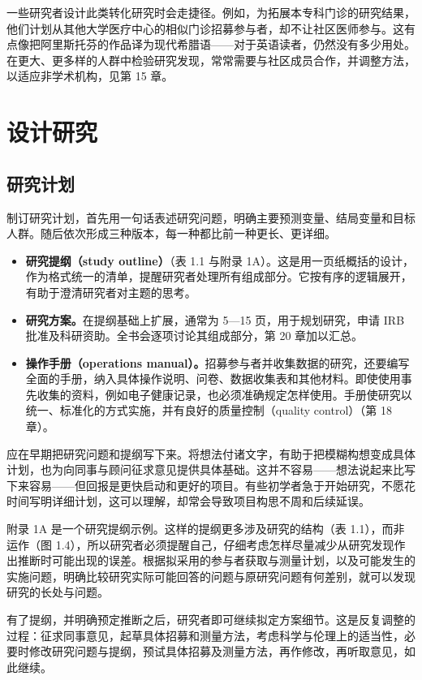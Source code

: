一些研究者设计此类转化研究时会走捷径。例如，为拓展本专科门诊的研究结果，他们计划从其他大学医疗中心的相似门诊招募参与者，却不让社区医师参与。这有点像把阿里斯托芬的作品译为现代希腊语——对于英语读者，仍然没有多少用处。在更大、更多样的人群中检验研究发现，常常需要与社区成员合作，并调整方法，以适应非学术机构，见第 15 章。

\section{设计研究}
\subsection{研究计划}
制订研究计划，首先用一句话表述研究问题，明确主要预测变量、结局变量和目标人群。随后依次形成三种版本，每一种都比前一种更长、更详细。
\begin{itemize}
\item \textbf{研究提纲（study outline）}（表 1.1 与附录 1A）。这是用一页纸概括的设计，作为格式统一的清单，提醒研究者处理所有组成部分。它按有序的逻辑展开，有助于澄清研究者对主题的思考。
\item \textbf{研究方案。}在提纲基础上扩展，通常为 5—15 页，用于规划研究，申请 IRB 批准及科研资助。全书会逐项讨论其组成部分，第 20 章加以汇总。
\item \textbf{操作手册（operations manual）。}招募参与者并收集数据的研究，还要编写全面的手册，纳入具体操作说明、问卷、数据收集表和其他材料。即使使用事先收集的资料，例如电子健康记录，也必须准确规定怎样使用。手册使研究以统一、标准化的方式实施，并有良好的质量控制（quality control）（第 18 章）。
\end{itemize}
应在早期把研究问题和提纲写下来。将想法付诸文字，有助于把模糊构想变成具体计划，也为向同事与顾问征求意见提供具体基础。这并不容易——想法说起来比写下来容易——但回报是更快启动和更好的项目。有些初学者急于开始研究，不愿花时间写明详细计划，这可以理解，却常会导致项目构思不周和后续延误。

附录 1A 是一个研究提纲示例。这样的提纲更多涉及研究的结构（表 1.1），而非运作（图 1.4），所以研究者必须提醒自己，仔细考虑怎样尽量减少从研究发现作出推断时可能出现的误差。根据拟采用的参与者获取与测量计划，以及可能发生的实施问题，明确比较研究实际可能回答的问题与原研究问题有何差别，就可以发现研究的长处与问题。

有了提纲，并明确预定推断之后，研究者即可继续拟定方案细节。这是反复调整的过程：征求同事意见，起草具体招募和测量方法，考虑科学与伦理上的适当性，必要时修改研究问题与提纲，预试具体招募及测量方法，再作修改，再听取意见，如此继续。

